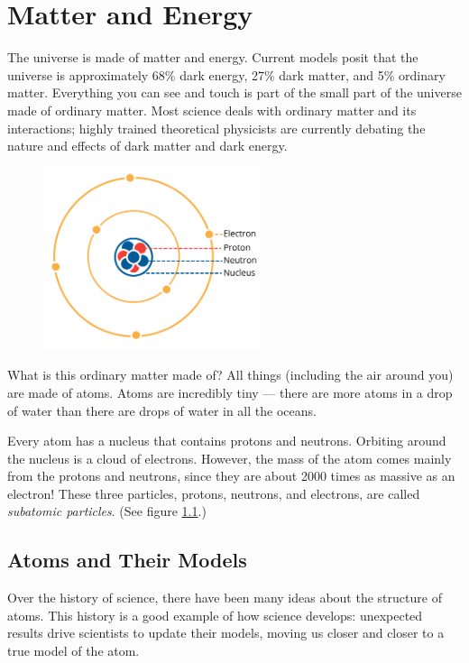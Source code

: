 \chapter{Matter and Energy}

The universe is made of matter and energy. Current models posit that the universe
is approximately 68\% dark energy, 27\% dark matter, and 5\% ordinary matter. 
Everything you can see and touch is part of the small part of the universe made 
of ordinary matter. Most science deals with ordinary matter and its interactions; 
highly trained theoretical physicists are currently debating the nature and 
effects of dark matter and dark energy. 
\begin{figure}
\noindent\includegraphics[width=2.5in]{atom1.png}
\caption{}
\label{fig:atom1}
\end{figure}

What is this ordinary matter made of? All things (including the air around you) 
are made of atoms. Atoms are incredibly tiny --- there are more atoms in a drop 
of water than there are drops of water in all the oceans.

Every atom has a nucleus that contains protons and neutrons. Orbiting around the
nucleus is a cloud of electrons. However, the mass of the atom comes mainly from 
the protons and neutrons, since they are about 2000 times as massive as an 
electron! These three particles, protons, neutrons, and electrons, are called
\textit{subatomic particles}. (See figure \ref{fig:atom1}.)  
  

\section{Atoms and Their Models}
Over the history of science, there have been many ideas about the structure of
atoms. This history is a good example of how science develops: unexpected
results drive scientists to update their models, moving us closer and closer to
a true model of the atom.

